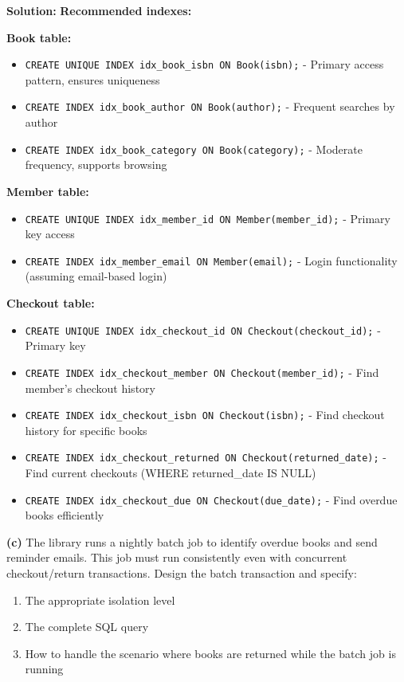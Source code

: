 \documentclass{article}
\begin{document}
\textbf{Solution:}
\textbf{Recommended indexes:}

\textbf{Book table:}
\begin{itemize}
    \item \texttt{CREATE UNIQUE INDEX idx\_book\_isbn ON Book(isbn);} - Primary access pattern, ensures uniqueness
    \item \texttt{CREATE INDEX idx\_book\_author ON Book(author);} - Frequent searches by author
    \item \texttt{CREATE INDEX idx\_book\_category ON Book(category);} - Moderate frequency, supports browsing
\end{itemize}

\textbf{Member table:}
\begin{itemize}
    \item \texttt{CREATE UNIQUE INDEX idx\_member\_id ON Member(member\_id);} - Primary key access
    \item \texttt{CREATE INDEX idx\_member\_email ON Member(email);} - Login functionality (assuming email-based login)
\end{itemize}

\textbf{Checkout table:}
\begin{itemize}
    \item \texttt{CREATE UNIQUE INDEX idx\_checkout\_id ON Checkout(checkout\_id);} - Primary key
    \item \texttt{CREATE INDEX idx\_checkout\_member ON Checkout(member\_id);} - Find member's checkout history
    \item \texttt{CREATE INDEX idx\_checkout\_isbn ON Checkout(isbn);} - Find checkout history for specific books
    \item \texttt{CREATE INDEX idx\_checkout\_returned ON Checkout(returned\_date);} - Find current checkouts (WHERE returned\_date IS NULL)
    \item \texttt{CREATE INDEX idx\_checkout\_due ON Checkout(due_date);} - Find overdue books efficiently
\end{itemize}

\textbf{(c)} The library runs a nightly batch job to identify overdue books and send reminder emails. This job must run consistently even with concurrent checkout/return transactions. Design the batch transaction and specify:
\begin{enumerate}
    \item The appropriate isolation level
    \item The complete SQL query
    \item How to handle the scenario where books are returned while the batch job is running
\end{enumerate}
\end{document}
